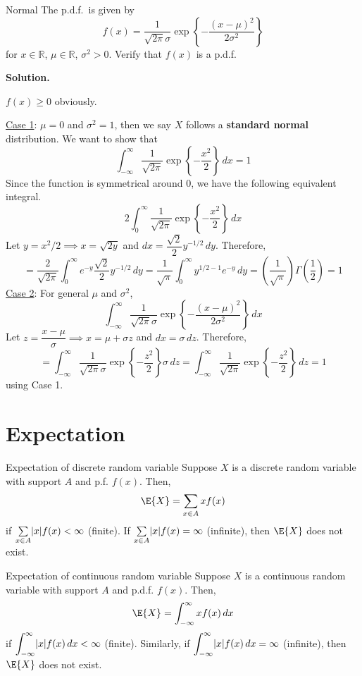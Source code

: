 \begin{Example}{Normal}{}
    The p.d.f.\ is given by
    \[ f(x)=\frac{1}{\sqrt{2\pi}\sigma}\exp\left\{ -\frac{(x-\mu)^2}{2\sigma^2} \right\}  \]
    for $ x\in\mathbb{R} $, $ \mu\in\mathbb{R} $, $ \sigma^2>0 $.
    Verify that $ f(x) $ is a p.d.f.

    \textbf{Solution.}

    $ f(x)\geqslant 0 $ obviously.

    \underline{Case 1}: $ \mu=0 $ and $ \sigma^2=1 $, then
    we say $ X $ follows a \textbf{standard normal} distribution.
    We want to show that
    \[ \int_{-\infty}^{\infty} \frac{1}{\sqrt{2\pi}}\exp\left\{ -\frac{x^2}{2} \right\} \, d{x}=1  \]
    Since the function is symmetrical around 0, we have the following equivalent integral.
    \[ 2\int_{0}^{\infty} \frac{1}{\sqrt{2\pi}}\exp\left\{ -\frac{x^2}{2} \right\} \, d{x}  \]
    Let $ y=x^2/2\implies x=\sqrt{2y} $
    and $ dx=\dfrac{\sqrt{2}}{2} y^{-1/2}\,dy $. Therefore,
    \[ =\frac{2}{\sqrt{2\pi}}\int_{0}^{\infty} e^{-y}\frac{\sqrt{2}}{2} y^{-1/2}\, d{y}
        =\frac{1}{\sqrt{\pi}}\int_{0}^{\infty} y^{1/2-1}e^{-y}\, d{y}=
        \left( \frac{1}{\sqrt{\pi}}  \right)\Gamma\left( \frac{1}{2} \right)=1    \]
    \underline{Case 2}: For general $ \mu $ and $ \sigma^2 $,
    \[ \int_{-\infty}^{\infty}  \frac{1}{\sqrt{2\pi}\sigma}\exp\left\{ -\frac{(x-\mu)^2}{2\sigma^2} \right\} \, d{x} \]
    Let $ z=\dfrac{x-\mu}{\sigma}\implies x=\mu+\sigma z  $
    and $ dx=\sigma\,dz $. Therefore,
    \[ =\int_{-\infty}^{\infty} \frac{1}{\sqrt{2\pi}\sigma}
        \exp\left\{ -\frac{z^2}{2}\right\}\sigma \, d{z}=
        \int_{-\infty}^{\infty} \frac{1}{\sqrt{2\pi}}\exp\left\{ -\frac{z^2}{2} \right\} \, d{z}=1   \]
    using Case 1.
\end{Example}
\section{Expectation}
\begin{Definition}{Expectation of discrete random variable}{}
    Suppose $ X $ is a discrete random variable with support
    $ A $ and p.f. $ f(x) $. Then,
    \[ \E{X}=\sum\limits_{x\in A}x f(x)  \]
    if $ \sum\limits_{x\in A}\lvert x\rvert f(x) < \infty $ (finite).
    If $ \sum\limits_{x\in A}\lvert x\rvert f(x) =\infty $ (infinite), then
    $ \E{X} $ does not exist.
\end{Definition}

\begin{Definition}{Expectation of continuous random variable}{}
    Suppose $ X $ is a continuous random variable with support $ A $
    and p.d.f. $ f(x) $. Then,
    \[ \E{X}=\int_{-\infty}^{\infty} x f(x)\, d{x}  \]
    if $ \displaystyle \int_{-\infty}^{\infty} \lvert x\rvert f(x)\, d{x} <\infty $
    (finite). Similarly,
    if $ \displaystyle \int_{-\infty}^{\infty} \lvert x\rvert f(x)\, d{x} =\infty $
    (infinite),
    then $ \E{X} $ does not exist.
\end{Definition}

